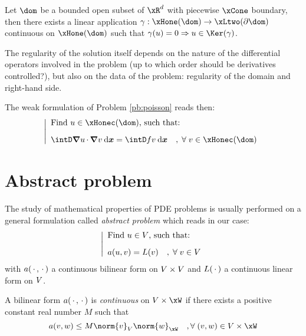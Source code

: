 \begin{lmm}
Let $\dom$ be a bounded open subset of $\xR^d$ with piecewise $\xCone$ boundary, then there exists a linear application $\gamma : \xHone(\dom) \fromto \xLtwo(\partial\dom)$ continuous on $\xHone(\dom)$ such that $\gamma(u) = 0 \Rightarrow u \in \Ker(\gamma)$.
\end{lmm}

The regularity of the solution itself depends on the nature of the differential operators involved in the problem (\eg up to which order should be derivatives controlled?), but also on the data of the problem: regularity of the domain and right-hand side.

\medskip
The weak formulation of Problem \eqref{pb:poisson} reads then:
\begin{equation}\label{pb:weak_poissonHone}
\left\lvert
\begin{array}{ll}
\mbox{Find $u \in \xHonec(\dom)$, such that:}\\[2ex]
\displaystyle\intD \Grad u\xDot \Grad v\dxx = \intD f v  \dxx\quad,\;\forany  v\in \xHonec(\dom)
\end{array}
\right .
\end{equation}

\section{Abstract problem}

The study of mathematical properties of PDE problems is usually performed on a general formulation called \textit{abstract problem} which reads in our case:
\begin{equation}\label{pb:abstract}
\left\lvert
\begin{array}{ll}
\mbox{Find $u \in {V}$, such that:}\\[2ex]
\displaystyle a( u, v ) = L(v)\quad,\;{\forall\;}  v\in {V}
\end{array}
\right .
\end{equation}
with $a(\,{\mathbf\cdot}\,,\,{\mathbf\cdot}\,)$ a continuous bilinear form on ${V}\times{V}$ and $L(\,{\mathbf\cdot}\,)$ a continuous linear form on ${V}$.

\begin{prpstn}[Continuity]
A bilinear form $a(\,{\mathbf\cdot}\,,\,{\mathbf\cdot}\,)$ is \textit{continuous} on $\xV\times\xW$ if there exists a positive constant real number $M$ such that
\begin{equation*}
a( v, w ) \leq M \norm{v}_\xV \norm{w}_\xW\quad,\forany (v,w)\in \xV\times\xW
\end{equation*}
\end{prpstn}

